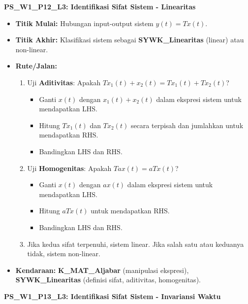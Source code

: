 \documentclass[
  letterpaper,
  DIV=11,
  numbers=noendperiod]{scrreprt}
\providecommand{\tightlist}{%
  \setlength{\itemsep}{0pt}\setlength{\parskip}{0pt}}\usepackage{longtable,booktabs,array}
\begin{document}
\textbf{PS\_W1\_P12\_L3: Identifikasi Sifat Sistem - Linearitas}

\begin{itemize}
\tightlist
\item
  \textbf{Titik Mulai:} Hubungan input-output sistem \(y(t) = T{x(t)}\).
\item
  \textbf{Titik Akhir:} Klasifikasi sistem sebagai
  \textbf{SYWK\_Linearitas} (linear) atau non-linear.
\item
  \textbf{Rute/Jalan:}

  \begin{enumerate}
  \def\labelenumi{\arabic{enumi}.}
  \tightlist
  \item
    Uji \textbf{Aditivitas}: Apakah
    \(T{x_1(t) + x_2(t)} = T{x_1(t)} + T{x_2(t)}\)?

    \begin{itemize}
    \tightlist
    \item
      Ganti \(x(t)\) dengan \(x_1(t) + x_2(t)\) dalam ekspresi sistem
      untuk mendapatkan LHS.
    \item
      Hitung \(T{x_1(t)}\) dan \(T{x_2(t)}\) secara terpisah dan
      jumlahkan untuk mendapatkan RHS.
    \item
      Bandingkan LHS dan RHS.
    \end{itemize}
  \item
    Uji \textbf{Homogenitas}: Apakah \(T{a x(t)} = a T{x(t)}\)?

    \begin{itemize}
    \tightlist
    \item
      Ganti \(x(t)\) dengan \(a x(t)\) dalam ekspresi sistem untuk
      mendapatkan LHS.
    \item
      Hitung \(a T{x(t)}\) untuk mendapatkan RHS.
    \item
      Bandingkan LHS dan RHS.
    \end{itemize}
  \item
    Jika kedua sifat terpenuhi, sistem linear. Jika salah satu atau
    keduanya tidak, sistem non-linear.
  \end{enumerate}
\item
  \textbf{Kendaraan:} \textbf{K\_MAT\_Aljabar} (manipulasi ekspresi),
  \textbf{SYWK\_Linearitas} (definisi sifat, aditivitas, homogenitas).
\end{itemize}

\textbf{PS\_W1\_P13\_L3: Identifikasi Sifat Sistem - Invariansi Waktu}
\end{document}
